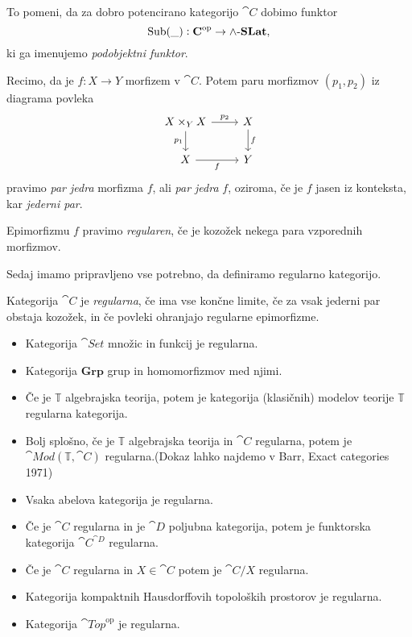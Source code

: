 \documentclass[../kategoricna_logika.tex]{subfiles}
\begin{document}
To pomeni, da za dobro potencirano kategorijo $\cat{C}$ dobimo funktor
$$\operatorname{Sub}(\_) : {\operatorname{\mathbf{C}}}^{\mathrm{op}} \to {\operatorname{\mathbf{\wedge-\mathbf{SLat}}}},$$
ki ga imenujemo \emph{podobjektni funktor}.
\begin{definicija}
    Recimo, da je $f : X \to Y$ morfizem v $\cat{C}$. Potem paru morfizmov $(p_1, p_2)$ iz diagrama povleka
    \begin{equation*}
        \begin{tikzcd}
        X \times_Y X \ar[d, "p_1"'] \ar[r, "p_2"] & X \ar[d, "f"] \\
        X \ar[r, "f"'] & Y
        \end{tikzcd}
    \end{equation*}
    pravimo \emph{par jedra} morfizma $f$, ali \emph{par jedra} $f$, oziroma,
    če je $f$ jasen iz konteksta, kar \emph{jederni par}.
\end{definicija}
\begin{definicija}
  Epimorfizmu $f$ pravimo \emph{regularen}, če je kozožek nekega para vzporednih morfizmov.
\end{definicija}
Sedaj imamo pripravljeno vse potrebno, da definiramo regularno kategorijo.
\begin{definicija}
    Kategorija $\cat{C}$ je \emph{regularna}, če ima vse končne limite,
    če za vsak jederni par obstaja kozožek, in če povleki ohranjajo regularne epimorfizme.
\end{definicija}
\begin{primer}
  \hfill
  \begin{itemize}
  \item Kategorija $\cat{Set}$ množic in funkcij je regularna.
  \item Kategorija $\mathbf{Grp}$ grup in homomorfizmov med njimi.
  \item Če je $\mathbb{T}$ algebrajska teorija, potem je kategorija
    (klasičnih) modelov teorije $\mathbb{T}$ regularna kategorija.
  \item Bolj splošno, če je $\mathbb{T}$ algebrajska teorija in
    $\cat{C}$ regularna, potem je $\cat{Mod}(\mathbb{T}, \cat{C})$
    regularna.(Dokaz lahko najdemo v Barr, Exact categories 1971)
  \item Vsaka abelova kategorija je regularna.
  \item Če je $\cat{C}$ regularna in je $\cat{D}$ poljubna kategorija,
    potem je funktorska kategorija $\cat{C}^{\cat{D}}$ regularna.
  \item Če je $\cat{C}$ regularna in $X \in \cat{C}$ potem je
    $\cat{C}/X$ regularna.
  \item Kategorija kompaktnih Hausdorffovih topoloških prostorov je
    regularna.
  \item Kategorija $\cat{Top}^{\mathrm{op}}$ je regularna.
  \end{itemize}
\end{primer}
\end{document}
